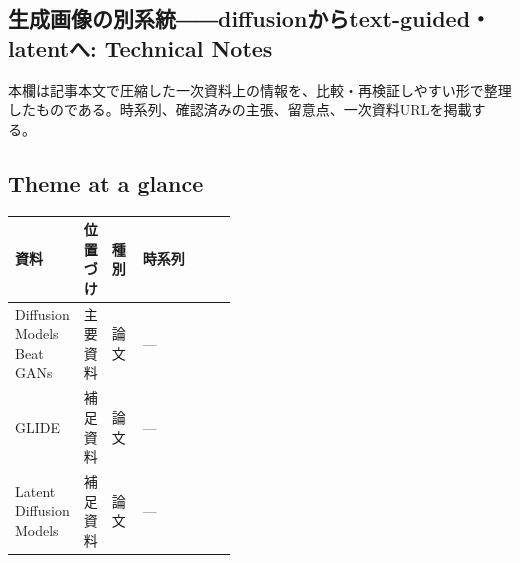 \subsection*{生成画像の別系統――diffusionからtext-guided・latentへ: Technical Notes}
本欄は記事本文で圧縮した一次資料上の情報を、比較・再検証しやすい形で整理したものである。時系列、確認済みの主張、留意点、一次資料URLを掲載する。
\smallskip
{}\par
\medskip
\subsection*{Theme at a glance}
\begin{center}
\footnotesize
\begin{tabularx}{\linewidth}{@{}p{0.20\linewidth}p{0.10\linewidth}p{0.14\linewidth}X@{}}
\toprule
資料 & 位置づけ & 種別 & 時系列 \\
\midrule
Diffusion Models Beat GANs & 主要資料 & 論文 & — \\
GLIDE & 補足資料 & 論文 & — \\
Latent Diffusion Models & 補足資料 & 論文 & — \\
\bottomrule
\end{tabularx}
\end{center}
\normalsize

